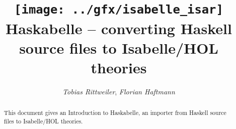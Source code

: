 \documentclass[12pt,a4paper,fleqn]{report}
\title{\texttt{[image: ../gfx/isabelle\_isar]}
  \\[4ex] Haskabelle -- converting Haskell source files to Isabelle/HOL theories}
\author{\emph{Tobias Rittweiler}, \emph{Florian Haftmann}}
\begin{document}
\maketitle

\begin{abstract}
  This document gives an Introduction to Haskabelle, an importer from
  Haskell source files to Isabelle/HOL theories.
\end{abstract}

\thispagestyle{empty}\clearpage

\clearfirst



\begingroup
 \small\raggedright\frenchspacing

\endgroup
\end{document}
